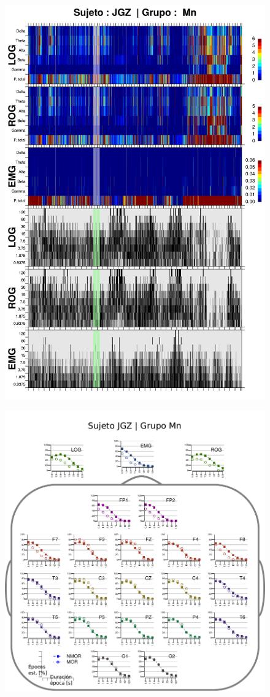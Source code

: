 \begin{figure}
\centering
\includegraphics[width=0.9\linewidth]
{./img_resultados/JGMN6SUE_combinado_.png} 
\end{figure}

\begin{figure}
\centering
\includegraphics[width=.9\linewidth]{./img_resultados/cabeza_JGZ.pdf}
\end{figure}


